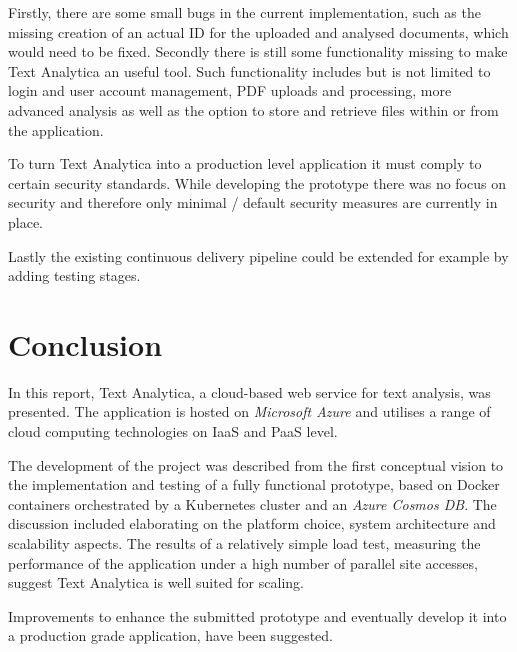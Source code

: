 \documentclass[conference]{IEEEtran}
\begin{document}
Firstly, there are some small bugs in the current implementation, such as the missing creation of an actual ID for the uploaded and analysed documents, which would need to be fixed. Secondly there is still some functionality missing to make Text Analytica an useful tool. Such functionality includes but is not limited to login and user account management, PDF uploads and processing, more advanced analysis as well as the option to store and retrieve files within or from the application.

To turn Text Analytica into a production level application it must comply to certain security standards. While developing the prototype there was no focus on security and therefore only minimal / default security measures are currently in place.

Lastly the existing continuous delivery pipeline could be extended for example by adding testing stages.

\section{Conclusion}
\label{sec:conclusion}
In this report, Text Analytica, a cloud-based web service for text analysis, was presented. The application is hosted on \textit{Microsoft Azure} and utilises a range of cloud computing technologies on IaaS and PaaS level.

The development of the project was described from the first conceptual vision to the implementation and testing of a fully functional prototype, based on Docker containers orchestrated by a Kubernetes cluster and an \textit{Azure Cosmos DB}. The discussion included elaborating on the platform choice, system architecture and scalability aspects. The results of a relatively simple load test, measuring the performance of the application under a high number of parallel site accesses, suggest Text Analytica is well suited for scaling.

Improvements to enhance the submitted prototype and eventually develop it into a production grade application, have been suggested.



\end{document}
